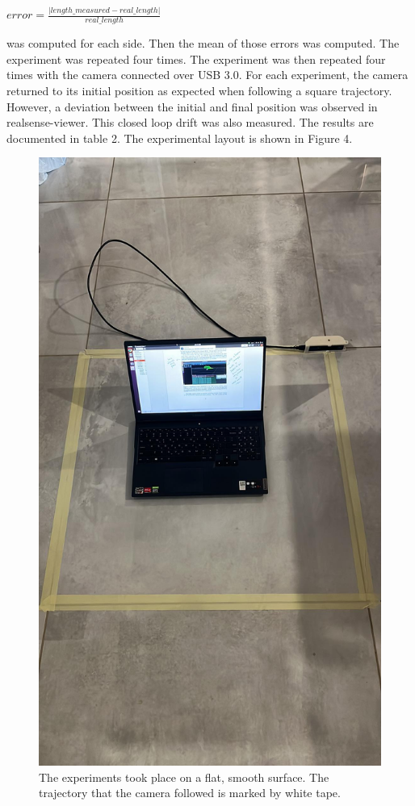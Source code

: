 \documentclass{article}
\begin{document}
\( error = \frac{| length\_measured - real\_length |} {real\_length} \)

was computed for each side. Then the mean of those errors was computed. The experiment was repeated four times. The experiment was then repeated four times with the camera connected over USB 3.0. For each experiment, the camera returned to its initial position as expected when following a square trajectory. However, a deviation between the initial and final position was observed in realsense-viewer. This closed loop drift was also measured. The results are documented in table 2. The experimental layout is shown in Figure 4.

\begin{figure}[h] %
	\centering
	\includegraphics[width=1\columnwidth]{report1-img026.jpg} %
	\caption{The experiments took place on a flat, smooth surface. The trajectory that the camera followed is marked by white tape.  }
\end{figure}
\end{document}
